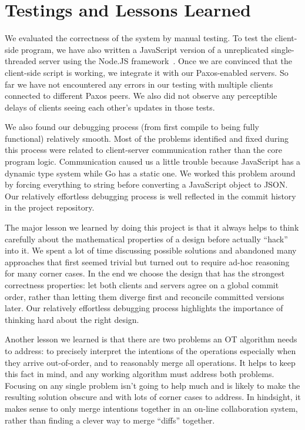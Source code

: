 \section{Testings and Lessons Learned}

We evaluated the correctness of the system by manual testing. To test the
client-side program, we have also written a JavaScript version of a unreplicated
single-threaded server using the Node.JS framework~\cite{nodejs}. Once we are
convinced that the client-side script is working, we integrate it with our
Paxos-enabled servers. So far we have not encountered any errors in our testing
with multiple clients connected to different Paxos peers. We also did not
observe any perceptible delays of clients seeing each other's updates in those
tests.

We also found our debugging process (from first compile to being fully
functional) relatively smooth. Most of the problems identified and fixed during
this process were related to client-server communication rather than the core
program logic. Communication caused us a little trouble because JavaScript has a
dynamic type system while Go has a static one. We worked this problem around by
forcing everything to string before converting a JavaScript object to JSON. Our
relatively effortless debugging process is well reflected in the commit history
in the project repository.

The major lesson we learned by doing this project is that it always helps to
think carefully about the mathematical properties of a design before actually
``hack'' into it. We spent a lot of time discussing possible solutions and
abandoned many approaches that first seemed trivial but turned out to require
ad-hoc reasoning for many corner cases. In the end we choose the design that has
the strongest correctness properties: let both clients and servers agree on a
global commit order, rather than letting them diverge first and reconcile
committed versions later. Our relatively effortless debugging process highlights
the importance of thinking hard about the right design.

Another lesson we learned is that there are two problems an OT algorithm needs
to address: to precisely interpret the intentions of the operations especially
when they arrive out-of-order, and to reasonably merge all operations. It helps
to keep this fact in mind, and any working algorithm must address both problems.
Focusing on any single problem isn't going to help much and is likely to make
the resulting solution obscure and with lots of corner cases to address. In
hindsight, it makes sense to only merge intentions together in an on-line
collaboration system, rather than finding a clever way to merge ``diffs''
together.
